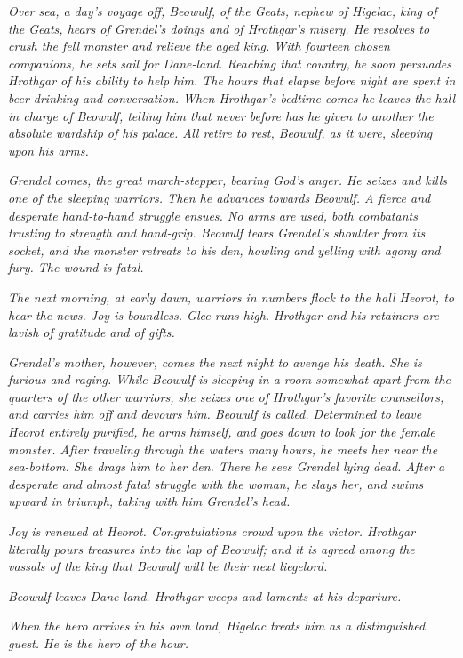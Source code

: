 \emph{Over sea, a day’s voyage off, Beowulf, of the Geats, nephew of Higelac,
king of the Geats, hears of Grendel’s doings and of Hrothgar’s misery. He
resolves to crush the fell monster and relieve the aged king. With fourteen
chosen companions, he sets sail for Dane-land. Reaching that country, he soon
persuades Hrothgar of his ability to help him. The hours that elapse before
night are spent in beer-drinking and conversation. When Hrothgar’s bedtime
comes he leaves the hall in charge of Beowulf, telling him that never before has
he given to another the absolute wardship of his palace. All retire to rest,
Beowulf, as it were, sleeping upon his arms.}

\emph{Grendel comes, the great march-stepper, bearing God’s anger. He seizes
and kills one of the sleeping warriors. Then he advances towards Beowulf.
A fierce and desperate hand-to-hand struggle ensues. No arms are used, both
combatants trusting to strength and hand-grip. Beowulf tears Grendel’s
shoulder from its socket, and the monster retreats to his den, howling and
yelling with agony and fury. The wound is fatal.}

\emph{The next morning, at early dawn, warriors in numbers flock to the hall
Heorot, to hear the news. Joy is boundless. Glee runs high. Hrothgar and
his retainers are lavish of gratitude and of gifts.}

\emph{Grendel’s mother, however, comes the next night to avenge his death. She
is furious and raging. While Beowulf is sleeping in a room somewhat apart from the quarters of the other warriors, she seizes one of Hrothgar’s favorite
counsellors, and carries him off and devours him. Beowulf is called. Determined
to leave Heorot entirely purified, he arms himself, and goes down to look
for the female monster. After traveling through the waters many hours, he
meets her near the sea-bottom. She drags him to her den. There he sees
Grendel lying dead. After a desperate and almost fatal struggle with the
woman, he slays her, and swims upward in triumph, taking with him Grendel’s
head.}

\emph{Joy is renewed at Heorot. Congratulations crowd upon the victor.
Hrothgar literally pours treasures into the lap of Beowulf; and it is agreed
among the vassals of the king that Beowulf will be their next liegelord.}

\emph{Beowulf leaves Dane-land. Hrothgar weeps and laments at his departure.}

\emph{When the hero arrives in his own land, Higelac treats him as a distinguished
guest. He is the hero of the hour.}

